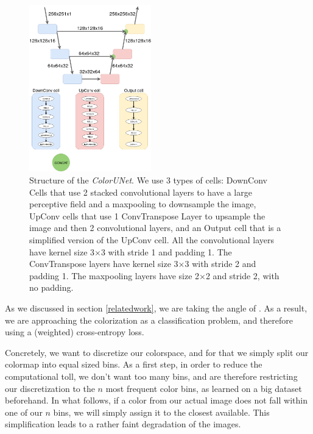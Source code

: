 \documentclass[10pt,twocolumn,letterpaper]{article}
\begin{document}
\begin{figure}
\begin{center}
\includegraphics[width=200px]{diagram}
\caption{Structure of the \textit{ColorUNet}. We use 3 types of cells: DownConv Cells that use 2 stacked convolutional layers to have a large perceptive field and a maxpooling to downsample the image, UpConv cells that use 1 ConvTranspose Layer to upsample the image and then 2 convolutional layers, and an Output cell that is a simplified version of the UpConv cell. All the convolutional layers have kernel size 3$\times$3  with stride 1 and padding 1. The ConvTranspose layers have kernel size 3$\times$3 with stride 2 and padding 1. The maxpooling layers have size 2$\times$2 and stride 2, with no padding. }
\label{structure}
\end{center}
\end{figure}
As we discussed in section \ref{relatedwork}, we are taking the angle of \cite{zhang2016colorful}. As a result, we are approaching the colorization as a classification problem, and therefore using a (weighted) cross-entropy loss.

Concretely, we want to discretize our colorspace, and for that we simply split our colormap into equal sized bins. As a first step, in order to reduce the computational toll, we don't want too many bins, and are therefore restricting our discretization to the $n$ most frequent color bins, as learned on a big dataset beforehand. In what follows, if a color from our actual image does not fall within one of our $n$ bins, we will simply assign it to the closest available. This simplification leads to a rather faint degradation of the images.
\end{document}
